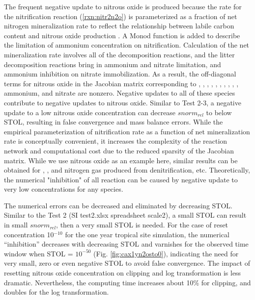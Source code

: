 \documentclass[gmd, manuscript]{copernicus}
\begin{document}
The frequent negative update to nitrous oxide is produced because the rate for
the nitrification reaction (\ref{rxn:nitr2n2o}) is parameterized as a fraction
of net nitrogen mineralization rate to reflect the relationship between labile carbon
content and nitrous oxide production \citep{Parton1996}. A Monod function is
added to describe the limitation of ammonium concentration on nitrification.
Calculation of the net mineralization rate involves all of the decomposition
reactions, and the litter decomposition reactions bring in ammonium and nitrate
limitation, and ammonium inhibition on nitrate immobilization. As a result, the
off-diagonal terms for nitrous oxide in the Jacobian matrix corresponding to
, , , , ,
, , , , , ammonium, and
nitrate are nonzero. Negative updates to all of these species 
contribute to negative updates to nitrous oxide. Similar to Test 2-3, a negative
update to a low nitrous oxide concentration can decrease $snorm_{rel}$ to below STOL,
resulting in false convergence and mass balance errors. While the empirical
parameterization of nitrification rate as a function of net mineralization rate
is conceptually convenient, it increases the complexity of the reaction network
and computational cost due to the reduced sparsity of the Jacobian matrix. While we use
nitrous oxide as an example here, similar results can be obtained for
, , and nitrogen gas produced from denitrification,
etc. Theoretically, the numerical "inhibition" of all reaction can be caused by
negative update to very low concentrations for any species. 

The numerical errors can be decreased and eliminated by decreasing STOL.
Similar to the Test 2 (SI test2.xlsx spreadsheet scale2), a small STOL can result in
small $snorm_{rel}$, then a very small STOL is needed. For the case of reset
concentration 10$^{-10}$ for the one year tropical site simulation, the
numerical ``inhibition'' decreases with decreasing STOL and varnishes for the
observed time window when STOL = $10^{-50}$ (Fig. \ref{fig:cax1yn2osto0}),
indicating the need for very small, zero or even negative STOL to avoid false
convergence. The impact of resetting nitrous oxide concentration on clipping
and log transformation is less dramatic. Nevertheless, the computing time
increases about 10\% for clipping, and doubles for the log transformation.  

\end{document}
